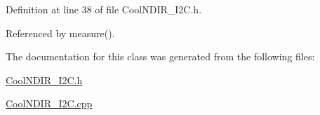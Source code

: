 Definition at line 38 of file Cool\+N\+D\+I\+R\+\_\+\+I2\+C.\+h.



Referenced by measure().



The documentation for this class was generated from the following files\+:\begin{DoxyCompactItemize}
\item 
\hyperlink{_cool_n_d_i_r___i2_c_8h}{Cool\+N\+D\+I\+R\+\_\+\+I2\+C.\+h}\item 
\hyperlink{_cool_n_d_i_r___i2_c_8cpp}{Cool\+N\+D\+I\+R\+\_\+\+I2\+C.\+cpp}\end{DoxyCompactItemize}
